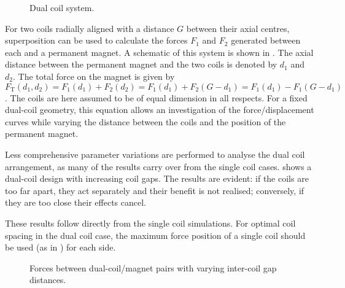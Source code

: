 \begin{figure}
  \caption{Dual coil system.}
\end{figure}

For two coils radially aligned with a distance $G$ between their axial
centres, superposition can be used to calculate the forces $F_1$ and
$F_2$ generated between each and a permanent magnet. A schematic of this
system is shown in . The axial
distance between the permanent magnet and the two coils is denoted by
$d_1$ and $d_2$. The total force on the magnet is given by
\begin{dmath}
F_{\mathrm{T}}(d_1,d_2)
  =F_1(d_1)+F_2(d_2)
  =F_1(d_1)+F_2(G-d_1)
  =F_1(d_1)-F_1(G-d_1)
\end{dmath}.
The coils are here assumed to be of equal dimension in all
respects. For a fixed dual-coil geometry, this equation allows an
investigation of the force/\-displacement curves while varying the
distance between the coils and the position of the permanent magnet.

Less comprehensive parameter variations are performed to analyse the dual coil 
arrangement, as many of the results carry over from the single coil
cases.  shows a dual-coil design with increasing coil
gaps. The results are evident: if the coils are too far apart, they
act separately and their benefit is not realised; conversely, if they
are too close their effects cancel.


These results follow directly from the single coil simulations. For
optimal coil spacing in the dual coil case, the maximum force position
of a single coil should be used (as in ) for each
side. 

\begin{figure}
  \begin{subfigure}
  \end{subfigure}\par
  \begin{subfigure}
  \end{subfigure}
  \caption{Forces between dual-coil/magnet pairs with varying
    inter-coil gap distances. }
\end{figure}
